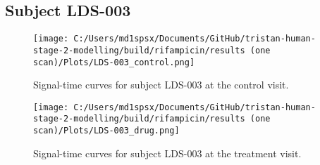 \documentclass{epflreport}%
\begin{document}
\subsection{Subject LDS{-}003}%
\label{subsec:SubjectLDS{-}003}%

%


\begin{figure}[h!]%
\centering%
\texttt{[image: C:/Users/md1spsx/Documents/GitHub/tristan-human-stage-2-modelling/build/rifampicin/results (one scan)/Plots/LDS-003\_control.png]}%
\caption{Signal{-}time curves for subject LDS{-}003 at the control visit.}%
\end{figure}

%


\begin{figure}[h!]%
\centering%
\texttt{[image: C:/Users/md1spsx/Documents/GitHub/tristan-human-stage-2-modelling/build/rifampicin/results (one scan)/Plots/LDS-003\_drug.png]}%
\caption{Signal{-}time curves for subject LDS{-}003 at the treatment visit.}%
\end{figure}
\end{document}
